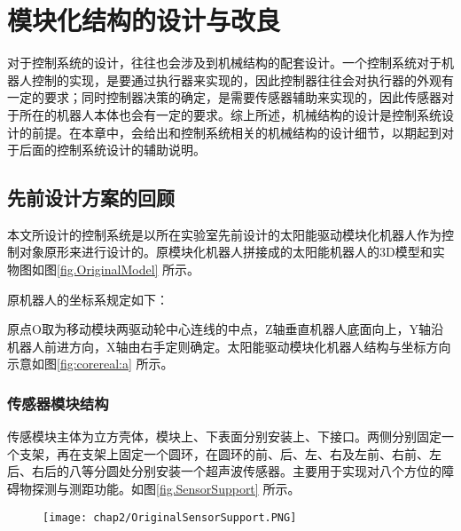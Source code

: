 
\chapter{模块化结构的设计与改良}
\label{chap:mechanicalSystem}
对于控制系统的设计，往往也会涉及到机械结构的配套设计。一个控制系统对于机器人控制的实现，是要通过执行器来实现的，因此控制器往往会对执行器的外观有一定的要求；同时控制器决策的确定，是需要传感器辅助来实现的，因此传感器对于所在的机器人本体也会有一定的要求。综上所述，机械结构的设计是控制系统设计的前提。在本章中，会给出和控制系统相关的机械结构的设计细节，以期起到对于后面的控制系统设计的辅助说明。

\section{先前设计方案的回顾}
本文所设计的控制系统是以所在实验室先前设计的太阳能驱动模块化机器人作为控制对象原形来进行设计的。原模块化机器人拼接成的太阳能机器人的3D模型和实物图如图\ref{fig.OriginalModel} 所示。 \\
\begin{figure}
  \centering
  \hspace{1in}
\end{figure}
原机器人的坐标系规定如下：

原点O取为移动模块两驱动轮中心连线的中点，Z轴垂直机器人底面向上，Y轴沿机器人前进方向，X轴由右手定则确定。太阳能驱动模块化机器人结构与坐标方向示意如图\ref{fig:corereal:a} 所示。
\subsection{传感器模块结构}
传感模块主体为立方壳体，模块上、下表面分别安装上、下接口。两侧分别固定一个支架，再在支架上固定一个圆环，在圆环的前、后、左、右及左前、右前、左后、右后的八等分圆处分别安装一个超声波传感器。主要用于实现对八个方位的障碍物探测与测距功能。如图\ref{fig.SensorSupport} 所示。
\begin{figure}[!htp]
  \centering
  \texttt{[image: chap2/OriginalSensorSupport.PNG]}
\end{figure}
